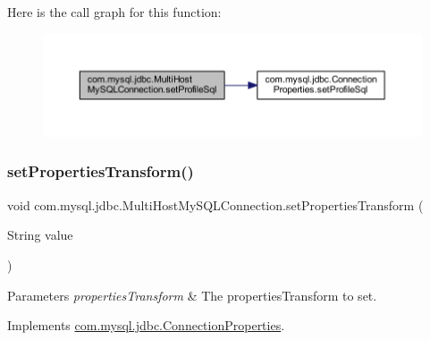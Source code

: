 Here is the call graph for this function\+:
\nopagebreak
\begin{figure}[H]
\begin{center}
\leavevmode
\includegraphics[width=350pt]{classcom_1_1mysql_1_1jdbc_1_1_multi_host_my_s_q_l_connection_a3da8b80a49c914ce7bcead678775fbbc_cgraph}
\end{center}
\end{figure}
\mbox{\label{classcom_1_1mysql_1_1jdbc_1_1_multi_host_my_s_q_l_connection_ab99171be57dd6ce8597774c664e46136}} 
\subsubsection{\texorpdfstring{set\+Properties\+Transform()}{setPropertiesTransform()}}
{\footnotesize\ttfamily void com.\+mysql.\+jdbc.\+Multi\+Host\+My\+S\+Q\+L\+Connection.\+set\+Properties\+Transform (\begin{DoxyParamCaption}\item[{String}]{value }\end{DoxyParamCaption})}


\begin{DoxyParams}{Parameters}
{\em properties\+Transform} & The properties\+Transform to set. \\
\hline
\end{DoxyParams}


Implements \mbox{\hyperlink{interfacecom_1_1mysql_1_1jdbc_1_1_connection_properties_a999fc9432437c9bf822f8e3ea6f03ce9}{com.\+mysql.\+jdbc.\+Connection\+Properties}}.

